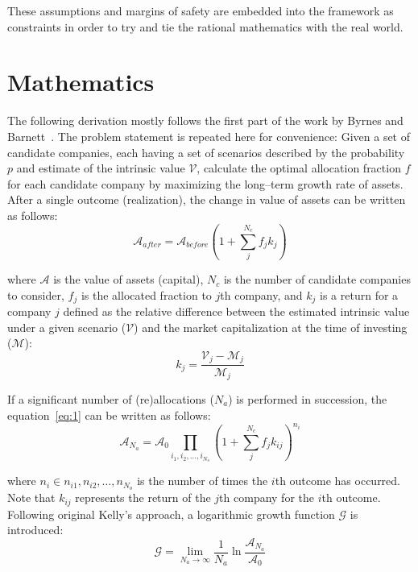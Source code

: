 \documentclass{article}
\begin{document}
These assumptions and margins of safety are embedded into the framework as
constraints in order to try and tie the rational mathematics with the real
world.

\section{Mathematics}
\label{sec:mathematics}

The following derivation mostly follows the first part of the work by Byrnes and
Barnett~\cite{byrnesBarnett}. The problem statement is repeated here for
convenience: Given a set of candidate companies, each having a set of scenarios
described by the probability $p$ and estimate of the intrinsic value
$\mathcal{V}$, calculate the optimal allocation fraction $f$ for each candidate
company by maximizing the long--term growth rate of assets. After a single
outcome (realization), the change in value of assets can be written as follows:
\begin{equation}
\label{eq:1}
    \mathcal{A}_{after}
  = 
    \mathcal{A}_{before}
    \left( 1 + \sum_{j}^{N_c} f_j k_j \right)
\end{equation} 

\noindent where $\mathcal{A}$ is the value of assets (capital), $N_c$ is the
number of candidate companies to consider, $f_j$ is the allocated fraction to
$j$th company, and $k_j$ is a return for a company $j$ defined as the relative
difference between the estimated intrinsic value under a given scenario
($\mathcal{V}$) and the market capitalization at the time of investing
($\mathcal{M}$):
\begin{equation}
\label{eq:2}
    k_j = \frac{\mathcal{V}_j - \mathcal{M}_j}{\mathcal{M}_j}
\end{equation}

\noindent If a significant number of (re)allocations ($N_a$) is performed in
succession, the equation~\eqref{eq:1} can be written as follows:
\begin{equation}
\label{eq:3}
    \mathcal{A}_{N_a}
  = 
    \mathcal{A}_{0} \prod_{i_1, i_2, \hdots, i_{N_o}}
    \left( 1 + \sum_{j}^{N_c} f_j k_{ij} \right)^{n_i}
\end{equation} 

\noindent where $n_i \in {n_{i1}, n_{i2}, \hdots, n_{N_o}}$ is the number of
times the $i$th outcome has occurred. Note that $k_{ij}$ represents the return
of the $j$th company for the $i$th outcome. Following original Kelly's approach,
a logarithmic growth function $\mathcal{G}$ is introduced:
\begin{equation}
\label{eq:4}
    \mathcal{G} = \lim_{N_a \to \infty} \frac{1}{N_a} \ln
        \frac{\mathcal{A}_{N_a}}{\mathcal{A}_0}
\end{equation}
\end{document}

